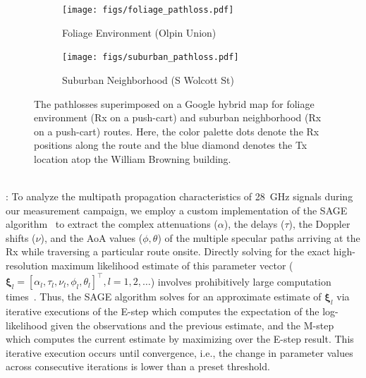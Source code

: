 \documentclass[10pt, twocolumn]{IEEEtran}
\begin{document}
{\begin{figure} [t]
    \centering
    \begin{subfigure}{0.5565\linewidth}
        \centering
        \texttt{[image: figs/foliage\_pathloss.pdf]}
        \caption{Foliage Environment (Olpin Union)}
        \label{F6a}
    \end{subfigure}
    \begin{subfigure}{0.4335\linewidth}
        \centering
        \texttt{[image: figs/suburban\_pathloss.pdf]}
        \caption{Suburban Neighborhood (S Wolcott St)}
        \label{F6b}
    \end{subfigure}
    \vspace{-5mm}
    \caption{The pathlosses superimposed on a Google hybrid map for foliage environment (Rx on a push-cart) and suburban neighborhood (Rx on a push-cart) routes. Here, the color palette dots denote the Rx positions along the route and the blue diamond denotes the Tx location atop the William Browning building.}
    \vspace{-5mm}
    \label{F6}
\end{figure}
\\: To analyze the multipath propagation characteristics of \SI{28}{\giga\hertz} signals during our measurement campaign, we employ a custom implementation of the SAGE algorithm~\cite{SAGE} to extract the complex attenuations ($\alpha$), the delays ($\tau$), the Doppler shifts ($\nu$), and the AoA values ($\phi,\theta$) of the multiple specular paths arriving at the Rx while traversing a particular route onsite. Directly solving for the exact high-resolution maximum likelihood estimate of this parameter vector ($\boldsymbol{\xi}_{l}{=}[\alpha_{l},\tau_{l},\nu_{l},\phi_{l},\theta_{l}]^{\intercal},l{=}1,2,{\dots}$) involves prohibitively large computation times~\cite{SAGE}. Thus, the SAGE algorithm solves for an approximate estimate of $\boldsymbol{\xi}_{l}$ via iterative executions of the E-step which computes the expectation of the log-likelihood given the observations and the previous estimate, and the M-step which computes the current estimate by maximizing over the E-step result. This iterative execution occurs until convergence, i.e., the change in parameter values across consecutive iterations is lower than a preset threshold.
\begin{figure} [t]
    \centering
    \begin{subfigure}{0.49\linewidth}
        \centering

\end{subfigure}
\end{figure}}
\end{document}
